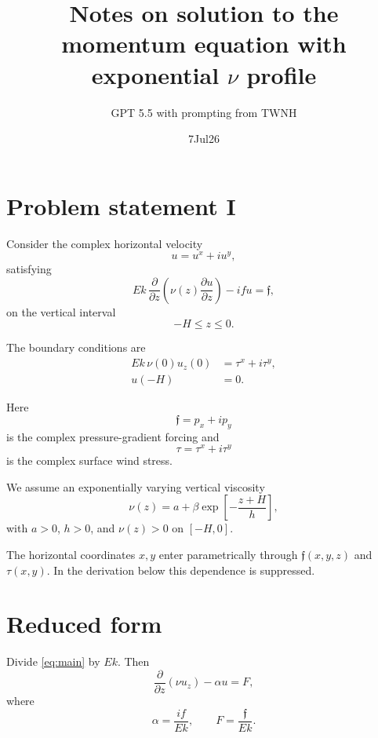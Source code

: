 \documentclass[10pt]{amsart}
\title{Notes on solution to the momentum equation with exponential $\nu$ profile}
\author{GPT 5.5 with  prompting from TWNH }
\date{7Jul26}                                           %
\begin{document}
\maketitle

\section{Problem statement I}

Consider the complex horizontal velocity
\begin{equation}
u = u^x+i u^y,
\end{equation}
satisfying
\begin{equation}
E k\,\frac{\partial}{\partial z}
\left(
\nu(z)\frac{\partial u}{\partial z}
\right)
-
i f u
=
\mathfrak f,
\label{eq:main}
\end{equation}
on the vertical interval
\[
-H\le z\le 0.
\]

The boundary conditions are
\begin{align}
E k\,\nu(0)u_z(0) &= \tau^x+i\tau^y, \label{eq:surface_bc}\\
u(-H)&=0. \label{eq:bottom_bc}
\end{align}

Here
\begin{equation}
\mathfrak f
=
p_x+i p_y
\label{eq:pressure_gradient}
\end{equation}
is the complex pressure-gradient forcing and
\begin{equation}
\tau
=
\tau^x+i\tau^y
\label{eq:complex_stress}
\end{equation}
is the complex surface wind stress.

We assume an exponentially varying vertical viscosity
\begin{equation}
\nu(z)
=
a+\beta \exp\!\left[-\frac{z+H}{h}\right],
\label{eq:viscosity}
\end{equation}
with \(a>0\), \(h>0\), and \(\nu(z)>0\) on \([-H,0]\).

The horizontal coordinates \(x,y\) enter parametrically through \(\mathfrak f(x,y,z)\) and \(\tau(x,y)\). In the derivation below this dependence is suppressed.

\section{Reduced form}

Divide \eqref{eq:main} by \(E k\). Then
\begin{equation}
\frac{\partial}{\partial z}
\left(
\nu u_z
\right)
-
\alpha u
=
F,
\label{eq:reduced}
\end{equation}
where
\begin{equation}
\alpha
=
\frac{i f}{E k},
\qquad
F
=
\frac{\mathfrak f}{E k}.
\label{eq:alpha_F}
\end{equation}
\end{document}
